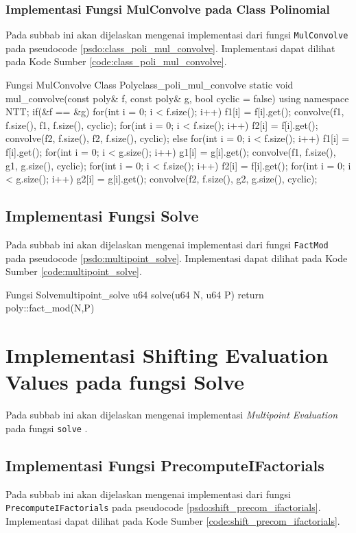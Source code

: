 \subsubsection{Implementasi Fungsi MulConvolve pada Class Polinomial}
Pada subbab ini akan dijelaskan mengenai implementasi dari fungsi \texttt{MulConvolve} pada pseudocode \ref{psdo:class_poli_mul_convolve}. Implementasi dapat dilihat pada Kode Sumber \ref{code:class_poli_mul_convolve}.


\begin{code}[firstnumber=1]{Fungsi MulConvolve Class Poly}{class_poli_mul_convolve}
	static void mul_convolve(const poly& f, const poly& g, bool cyclic = false) {
		using namespace NTT;
		if(&f == &g){
			for(int i = 0; i < f.size(); i++) f1[i] = f[i].get();
			convolve(f1, f.size(), f1, f.size(), cyclic);
			for(int i = 0; i < f.size(); i++) f2[i] = f[i].get();
			convolve(f2, f.size(), f2, f.size(), cyclic);
		} else{
			for(int i = 0; i < f.size(); i++) f1[i] = f[i].get();
			for(int i = 0; i < g.size(); i++) g1[i] = g[i].get();
			convolve(f1, f.size(), g1, g.size(), cyclic);
			for(int i = 0; i < f.size(); i++) f2[i] = f[i].get();
			for(int i = 0; i < g.size(); i++) g2[i] = g[i].get();
			convolve(f2, f.size(), g2, g.size(), cyclic);
		}
	}
\end{code}

\subsection{Implementasi Fungsi Solve}
Pada subbab ini akan dijelaskan mengenai implementasi dari fungsi \texttt{FactMod} pada pseudocode \ref{psdo:multipoint_solve}. Implementasi dapat dilihat pada Kode Sumber \ref{code:multipoint_solve}.


\begin{code}[firstnumber=1]{Fungsi Solve}{multipoint_solve}
	u64 solve(u64 N, u64 P) {
		return poly::fact_mod(N,P)
	}
\end{code}

\section{Implementasi Shifting Evaluation Values pada fungsi Solve}
Pada subbab ini akan dijelaskan mengenai implementasi \textit{Multipoint Evaluation} pada fungsi \texttt{solve} .

\subsection{Implementasi Fungsi PrecomputeIFactorials}
Pada subbab ini akan dijelaskan mengenai implementasi dari fungsi \texttt{PrecomputeIFactorials} pada pseudocode \ref{psdo:shift_precom_ifactorials}. Implementasi dapat dilihat pada Kode Sumber \ref{code:shift_precom_ifactorials}.

